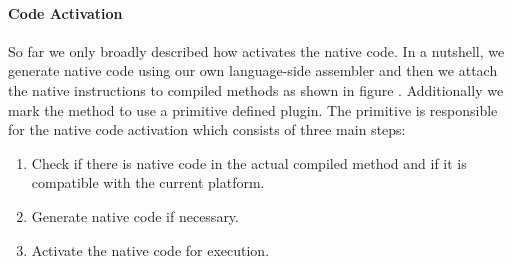 \paragraph{Code Activation}
 
So far we only broadly described how \B activates the native code.
In a nutshell, we generate native code using our own language-side assembler and then we attach the native instructions to compiled methods as shown in figure .
Additionally we mark the method to use a primitive defined \B plugin.
The \B primitive is responsible for the native code activation which consists of three main steps:
%
\begin{enumerate}[noitemsep]
	\item Check if there is native code in the actual compiled method and if it is compatible with the current platform.
	\item Generate native code if necessary.
	\item Activate the native code for execution.
\end{enumerate}

